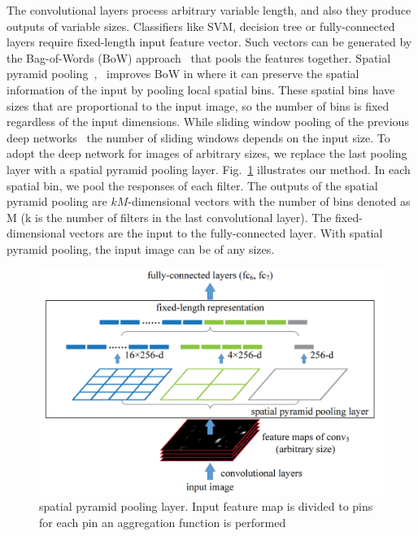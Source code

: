 The convolutional layers process arbitrary variable length, and also they produce outputs of variable sizes. Classifiers like SVM, decision tree or fully-connected layers require fixed-length input feature vector. Such vectors can be generated by the Bag-of-Words (BoW) approach~\cite{sivic2003video} that pools the features together. Spatial pyramid pooling~\cite{grauman2005pyramid},~\cite{lazebnik2006beyond} improves BoW in where it can preserve the spatial information of the input by pooling local spatial bins. These spatial bins have sizes that are proportional to the input image, so the number of bins is fixed regardless of the input dimensions. While sliding window pooling of the previous deep networks~\cite{krizhevsky2012imagenet} the number of sliding windows depends on the input size. To adopt the deep network for images of arbitrary sizes, we replace the last pooling layer with a spatial pyramid pooling layer.
Fig.~\ref{originalSpp} illustrates our method. In each spatial bin, we pool the responses of each filter. The outputs of the spatial pyramid pooling are $kM$-dimensional vectors with the number of bins denoted as M (k is the number of filters in the last convolutional layer). The fixed-dimensional vectors are the input to the fully-connected layer. With spatial pyramid pooling, the input image can be of any sizes.
\begin{figure}
    \begin{center}
        \includegraphics[width=\textwidth]{Figures/SPP.png}
        \caption{\label{originalSpp} spatial pyramid
        pooling layer. Input feature map is divided to pins for each pin an aggregation function is performed}
    \end{center}
\end{figure}

